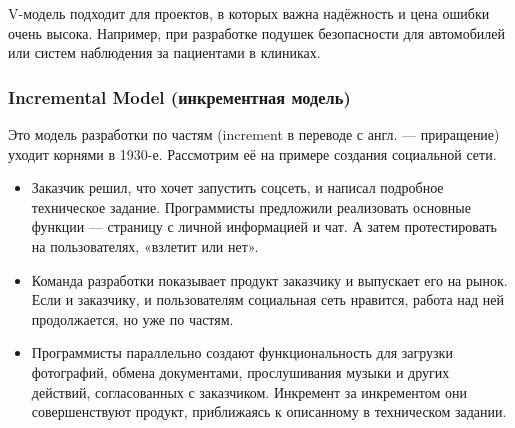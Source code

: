 \documentclass[a4paper]{article}
\begin{document}
V-модель подходит для проектов, в которых важна надёжность и цена ошибки очень высока. Например, при разработке подушек безопасности для автомобилей или систем наблюдения за пациентами в клиниках.

\subsubsection{Incremental Model (инкрементная модель)}

Это модель разработки по частям (increment в переводе с англ. — приращение) уходит корнями в 1930-е. Рассмотрим её на примере создания социальной сети.

\begin{itemize}
    \item Заказчик решил, что хочет запустить соцсеть, и написал подробное техническое задание. Программисты предложили реализовать основные функции — страницу с личной информацией и чат. А затем протестировать на пользователях, «взлетит или нет».
    \item Команда разработки показывает продукт заказчику и выпускает его на рынок. Если и заказчику, и пользователям социальная сеть нравится, работа над ней продолжается, но уже по частям.
    \item Программисты параллельно создают функциональность для загрузки фотографий, обмена документами, прослушивания музыки и других действий, согласованных с заказчиком. Инкремент за инкрементом они совершенствуют продукт, приближаясь к описанному в техническом задании.
\end{itemize}

\begin{figure}[h]
\end{figure}
\end{document}
